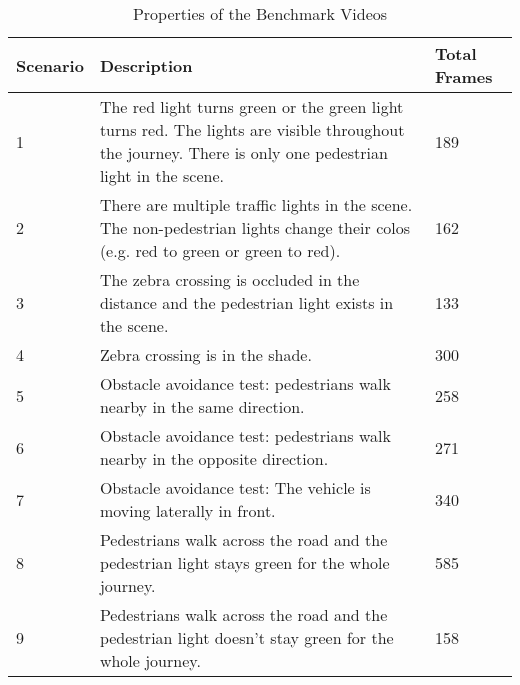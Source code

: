 \begin{table}[!t]
	\centering
	\caption{\footnotesize Properties of the Benchmark Videos}
	\label{Table:Benchmarks}
	 \begin{tabular}{p{1cm}p{4.5cm}p{2cm}}	
		\hline
		Scenario &    Description      &  Total Frames         \\ \hline \hline
		1        &    The red light turns green or the green light turns red. The lights are visible throughout the journey. There is only one pedestrian light in the scene.      &      189    \\ \hline  %
		2        & There are multiple traffic lights in the scene. The non-pedestrian lights change their colos (e.g. red to green or green to red). &      162       \\ \hline  %
	    3     	 & The zebra crossing is occluded in the distance and the pedestrian light exists in the scene.     &      133       \\ \hline   %
		4        & Zebra crossing is in the shade.  &     300      \\ \hline   %
		5        & Obstacle avoidance test: pedestrians walk nearby in the same direction. &    258        \\ \hline %
		6        & Obstacle avoidance test: pedestrians walk nearby in the opposite direction.   &       271      \\ \hline  %
		7        & Obstacle avoidance test: The vehicle is moving laterally in front.   &      340       \\ \hline  %
		8        & Pedestrians walk across the road and the pedestrian light stays green for the whole journey.   &       585      \\ \hline  %
		9        & Pedestrians walk across the road and the pedestrian light doesn't stay green for the whole journey.   &        158     \\ \hline  %
	\end{tabular}
\end{table}









